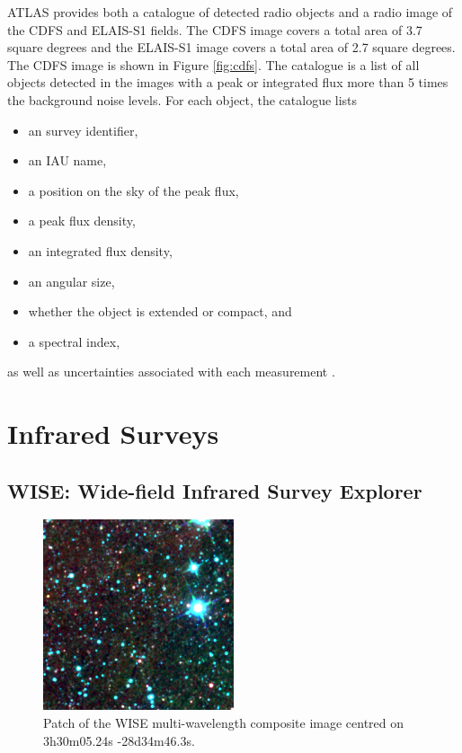             ATLAS provides both a catalogue of detected radio objects and a
            radio image of the CDFS and ELAIS-S1 fields. The CDFS image covers a
            total area of 3.7 square degrees and the ELAIS-S1 image covers a
            total area of 2.7 square degrees. The CDFS image is shown in Figure
            \ref{fig:cdfs}. The catalogue is a list of all objects detected in
            the images with a peak or integrated flux more than 5 times the
            background noise levels. For each object, the catalogue lists
            \begin{itemize}
                \setlength\itemsep{0 pt}
                \item an survey identifier,
                \item an IAU name,
                \item a position on the sky of the peak flux,
                \item a peak flux density,
                \item an integrated flux density,
                \item an angular size,
                \item whether the object is extended or compact, and
                \item a spectral index,
            \end{itemize}
            as well as uncertainties associated with each measurement
            \citep{franzen15}.

    \section{Infrared Surveys}
    \label{sec:infrared-surveys}

        \subsection{WISE: Wide-field Infrared Survey Explorer}
        \label{sec:wise}

            \begin{figure}[!ht]
                \centering
                \includegraphics[width=0.5\textwidth]
                    {images/WISE_3h30m05.24s-28d34m46.3s.png}
                \caption{Patch of the WISE multi-wavelength composite image
                    centred on 3h30m05.24s -28d34m46.3s.}
                \label{fig:wise}
            \end{figure}

